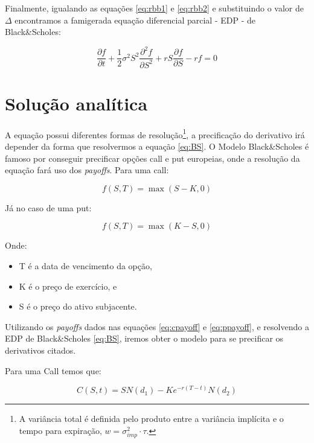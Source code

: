 \documentclass[]{book}
\providecommand{\tightlist}{%
  \setlength{\itemsep}{0pt}\setlength{\parskip}{0pt}}
\let\rmarkdownfootnote\footnote%
\def\footnote{\protect\rmarkdownfootnote}
\begin{document}
Finalmente, igualando as equações \eqref{eq:rbb1} e \eqref{eq:rbb2} e
substituindo o valor de \(\Delta\) encontramos a famigerada equação
diferencial parcial - EDP - de Black\&Scholes:

\begin{equation}
\frac{\partial f}{\partial t}+\frac{1}{2}\sigma^2S^2\frac{\partial^2 f}{\partial S^2}+rS\frac{\partial f}{\partial S} - rf = 0
\label{eq:BS}
\end{equation}

\section{Solução analítica}\label{solucao-analitica}

A equação possui diferentes formas de resolução\footnote{A variância
  total é definida pelo produto entre a variância implícita e o tempo
  para expiração, \(w=\sigma^2_{imp}\cdot\tau\).}, a precificação do
derivativo irá depender da forma que resolvermos a equação \eqref{eq:BS}.
O Modelo Black\&Scholes é famoso por conseguir precificar opções call e
put europeias, onde a resolução da equação fará uso dos \emph{payoffs}.
Para uma call:

\begin{equation}
\displaystyle f(S,T)=\max(S-K,0)
\label{eq:cpayoff}
\end{equation}

Já no caso de uma put:

\begin{equation}
\displaystyle f(S,T)=\max(K-S,0)
\label{eq:ppayoff}
\end{equation}

Onde:

\begin{itemize}
\tightlist
\item
  T é a data de vencimento da opção,
\item
  K é o preço de exercício, e
\item
  S é o preço do ativo subjacente.
\end{itemize}

Utilizando os \emph{payoffs} dados nas equações \eqref{eq:cpayoff} e
\eqref{eq:ppayoff}, e resolvendo a EDP de Black\&Scholes \eqref{eq:BS},
iremos obter o modelo para se precificar os derivativos citados.

Para uma Call temos que:

\begin{equation}
C(S,t)=SN(d_{1})-Ke^{-r(T-t)}N(d_{2})
\label{eq:call}
\end{equation}
\end{document}
